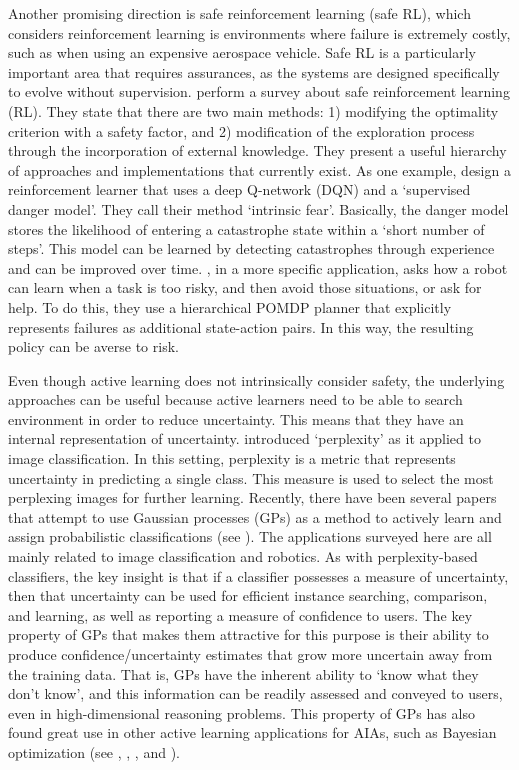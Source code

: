 Another promising direction is safe reinforcement learning (safe RL), which considers reinforcement learning is environments where failure is extremely costly, such as when using an expensive aerospace vehicle. 
Safe RL is a particularly important area that requires assurances, as the systems are designed specifically to evolve without supervision. \citet{Garcia2015-rs} perform a survey about safe reinforcement learning (RL). They state that there are two main methods: 1) modifying the optimality criterion with a safety factor, and 2) modification of the exploration process through the incorporation of external knowledge. They present a useful hierarchy of approaches and implementations that currently exist. 
As one example, \citet{Lipton2016-dq} design a reinforcement learner that uses a deep Q-network (DQN) and a `supervised danger model'. They call their method `intrinsic fear'. Basically, the danger model stores the likelihood of entering a catastrophe state within a `short number of steps'. This model can be learned by detecting catastrophes through experience and can be improved over time. \citet{Curran2016-ij}, in a more specific application, asks how a robot can learn when a task is too risky, and then avoid those situations, or ask for help. To do this, they use a hierarchical POMDP planner that explicitly represents failures as additional state-action pairs. In this way, the resulting policy can be averse to risk.

    Even though active learning does not intrinsically consider safety, the underlying approaches can be useful because active learners need to be able to search environment in order to reduce uncertainty. This means that they have an internal representation of uncertainty. \citet{Paul2011-vr} introduced `perplexity' as it applied to image classification. In this setting, perplexity is a metric that represents uncertainty in predicting a single class. This measure is used to select the most perplexing images for further learning. 
Recently, there have been several papers that attempt to use Gaussian processes (GPs) as a method to actively learn and assign probabilistic classifications (see \citet{MacKay1992-sp,Triebel2016-kj,Triebel2013-ow,Triebel2013-ku,Grimmett2013-gj,Grimmett2016-yc,Berczi2015-rd,Dequaire2016-kh}). The applications surveyed here are all mainly related to image classification and robotics. As with perplexity-based classifiers, the key insight is that if a classifier possesses a measure of uncertainty, then that uncertainty can be used for efficient instance searching, comparison, and learning, as well as reporting a measure of confidence to users. The key property of GPs that makes them attractive for this purpose is their ability to produce confidence/uncertainty estimates that grow more uncertain away from the training data. That is, GPs have the inherent ability to `know what they don't know', and this information can be readily assessed and conveyed to users, even in high-dimensional reasoning problems. This property of GPs has also found great use in other active learning applications for AIAs, such as Bayesian optimization (see \citet{Williams1998-kr}, \citet{Snoek2012-tt}, \citet{Brochu2010-tj}, and \citet{Israelsen2017-zb}).


